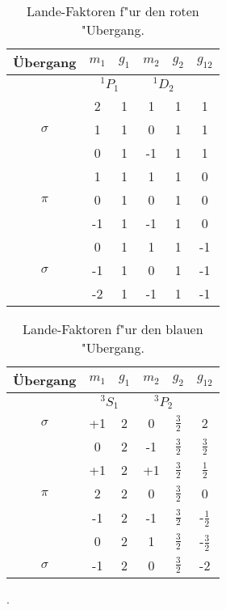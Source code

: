     \begin{table}
    	\centering
    	\begin{tabular}{c|cc|cc|c}
    		Übergang & $m_1$  & $g_{1}$ & $m_2$ & $ g_2$ & $g_{12}$\\
    		\midrule
    		& \multicolumn{2}{c}{${}^1P_1$}  & \multicolumn{2}{c}{${}^1D_2$} \\
    		\midrule
    		& 2 & 1 & 1 & 1 & 1\\
    		$\sigma$& 1 & 1 & 0 & 1 & 1\\
    		& 0 & 1 & -1 & 1 & 1\\
    		\midrule
    		& 1 & 1 & 1 & 1 & 0\\
    		$\pi$ & 0 & 1 & 0 & 1 & 0\\
    		& -1 & 1 & -1 & 1 & 0\\
    		\midrule
    		& 0 & 1 & 1 & 1 & -1\\
    		$\sigma$ & -1 & 1 & 0 & 1 & -1\\
    		& -2 & 1 & -1 & 1 & -1\\\bottomrule
    	\end{tabular}
    	\caption{Lande-Faktoren f"ur den roten "Ubergang.}
    	\label{rot}
    \end{table}
    \begin{table}
    	\centering
    	\begin{tabular}{c|cc|cc|c}
    		Übergang & $m_1$  & $g_{1}$ & $m_2$ & $ g_2$ & $g_{12}$\\
    		\midrule
    		& \multicolumn{2}{c}{${}^3S_1$}  & \multicolumn{2}{c}{${}^3P_2$} \\
    		\midrule
    		$\sigma$ & +1 & 2 & 0 & $\frac{3}{2}$& 2\\
    		& 0 & 2 & -1 & $\frac{3}{2}$ & $\frac{3}{2}$\\
    		\midrule
    		& +1 & 2 & +1 & $\frac{3}{2}$ & $\frac{1}{2}$\\
    		$\pi$ & 2 & 2 & 0 & $\frac{3}{2}$ & 0 \\
    		& -1 & 2 & -1 & $\frac{3}{2}$ & -$\frac{1}{2}$\\
    		\midrule
    		& 0 & 2 & 1 & $\frac{3}{2}$ & -$\frac{3}{2}$\\
    		$\sigma$ & -1 & 2 & 0 & $\frac{3}{2}$& -2\\
    		\bottomrule
    	\end{tabular}
    	\caption{Lande-Faktoren f"ur den blauen "Ubergang.}
    	\label{blau}
    \end{table}



    .
